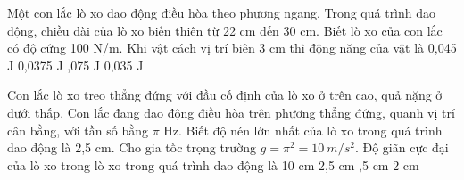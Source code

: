 \begin{ex}%
Một con lắc lò xo dao động điều hòa theo phương ngang. Trong quá trình dao động, chiều dài của lò xo biến thiên từ 22 cm đến 30 cm. Biết lò xo của con lắc có độ cứng 100 N/m. Khi vật cách vị trí biên 3 cm thì động năng của vật là
\choice
{0,045 J}
{0,0375 J}
{,075 J}
{0,035 J}
\end{ex} 
\begin{ex}%
Con lắc lò xo treo thẳng đứng với đầu cố định của lò xo ở trên cao, quả nặng ở dưới thấp. Con lắc đang dao động điều hòa trên phương thẳng đứng, quanh vị trí cân bằng, với tần số bằng $\pi$ Hz. Biết độ nén lớn nhất của lò xo trong quá trình dao động là 2,5 cm. Cho gia tốc trọng trường $g = \pi^2 = 10\ m/s^2$. Độ giãn cực đại của lò xo trong lò xo trong quá trình dao động là
\choice
{10 cm}
{2,5 cm}
{,5 cm}
{2 cm}
\end{ex} 

